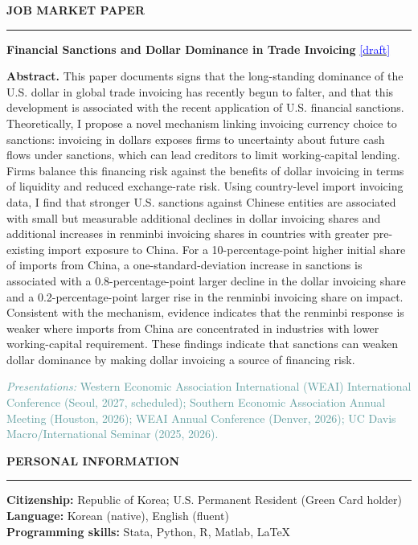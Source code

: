 \documentclass[11pt]{article}
\newcommand{\sechead}[1]{%
  \vspace{4pt}%
  {\normalsize\bfseries\uppercase{#1}}\\[-8pt]%
  \noindent\rule{\textwidth}{0.4pt}%
  \vspace{0.5pt}%
}
\begin{document}
\sechead{Job Market Paper}
\textbf{Financial Sanctions and Dollar Dominance in Trade Invoicing} \href{https://www.daihongmin.com/jmp.pdf}{\textcolor{blue}{[draft]}}\par
\vspace{-2.5pt}
{\small
\textbf{Abstract.} This paper documents signs that the long-standing dominance of the U.S. dollar in global trade invoicing has recently begun to falter, and that this development is associated with the recent application of U.S. financial sanctions. Theoretically, I propose a novel mechanism linking invoicing currency choice to sanctions: invoicing in dollars exposes firms to uncertainty about future cash flows under sanctions, which can lead creditors to limit working-capital lending. Firms balance this financing risk against the benefits of dollar invoicing in terms of liquidity and reduced exchange-rate risk. Using country-level import invoicing data, I find that stronger U.S. sanctions against Chinese entities are associated with small but measurable additional declines in dollar invoicing shares and additional increases in renminbi invoicing shares in countries with greater pre-existing import exposure to China. For a 10-percentage-point higher initial share of imports from China, a one-standard-deviation increase in sanctions is associated with a 0.8-percentage-point larger decline in the dollar invoicing share and a 0.2-percentage-point larger rise in the renminbi invoicing share on impact. Consistent with the mechanism, evidence indicates that the renminbi response is weaker where imports from China are concentrated in industries with lower working-capital requirement. These findings indicate that sanctions can weaken dollar dominance by making dollar invoicing a source of financing risk.\par
}
\vspace{-0.5em}
{\footnotesize\textcolor{CadetBlue}{%
\textit{Presentations:} Western Economic Association International (WEAI) International Conference (Seoul, 2027, scheduled); Southern Economic Association Annual Meeting (Houston, 2026); WEAI Annual Conference (Denver, 2026); UC Davis Macro/International Seminar (2025, 2026).}\par
}

\sechead{Personal Information}
\textbf{Citizenship:} Republic of Korea; U.S. Permanent Resident (Green Card holder) \\
\textbf{Language:} Korean (native), English (fluent) \\
\textbf{Programming skills:} Stata, Python, R, Matlab, \LaTeX\par
\end{document}
